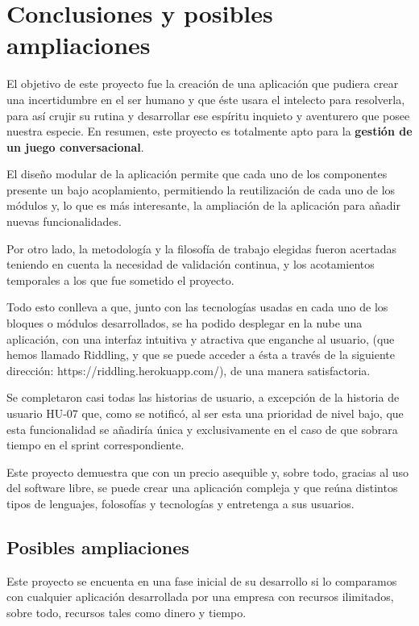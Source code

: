 \chapter{Conclusiones y posibles ampliaciones}

El objetivo de este proyecto fue la creación de una aplicación que pudiera crear una incertidumbre en el ser humano y que éste usara el intelecto para resolverla, para así crujir su rutina y desarrollar ese espíritu inquieto y aventurero que posee nuestra especie. En resumen, este proyecto es totalmente apto para la \textbf{gestión de un juego conversacional}. 

El diseño modular de la aplicación permite que cada uno de los componentes presente un bajo acoplamiento, permitiendo la reutilización de cada uno de los módulos y, lo que es más interesante, la ampliación de la aplicación para añadir nuevas funcionalidades. 

Por otro lado, la metodología y la filosofía de trabajo elegidas fueron acertadas teniendo en cuenta la necesidad de validación continua, y los acotamientos temporales a los que fue sometido el proyecto.

Todo esto conlleva a que, junto con las tecnologías usadas en cada uno de los bloques o módulos desarrollados, se ha podido desplegar en la nube una aplicación, con una interfaz intuitiva y atractiva que enganche al usuario, (que hemos llamado Riddling, y que se puede acceder a ésta a través de la siguiente dirección: https://riddling.herokuapp.com/), de una manera satisfactoria.

Se completaron casi todas las historias de usuario, a excepción de la historia de usuario HU-07 que, como se notificó, al ser esta una prioridad de nivel bajo, que esta funcionalidad se añadiría única y exclusivamente en el caso de que sobrara tiempo en el sprint correspondiente.

Este proyecto demuestra que con un precio asequible y, sobre todo, gracias al uso del software libre, se puede crear una aplicación compleja y que reúna distintos tipos de lenguajes, folosofías y tecnologías y entretenga a sus usuarios.

\section{Posibles ampliaciones}

Este proyecto se encuenta en una fase inicial de su desarrollo si lo comparamos con cualquier aplicación desarrollada por una empresa con recursos ilimitados, sobre todo, recursos tales como dinero y tiempo.

